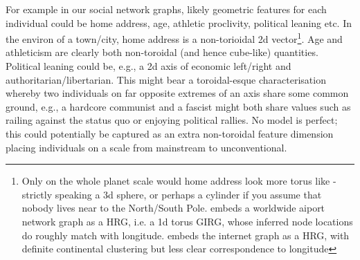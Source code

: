 
For example in our social network graphs, likely geometric features for each individual could be home address, age, athletic proclivity, political leaning etc.
In the environ of a town/city, home address is a non-torioidal 2d vector\footnote{Only on the whole planet scale would home address look more torus like - strictly speaking a 3d sphere, or perhaps a cylinder if you assume that nobody lives near to the North/South Pole. \cite{garcia2019mercator} embeds a worldwide aiport network graph as a HRG, i.e. a 1d torus GIRG, whose inferred node locations do roughly match with longitude. \cite{boguna2010sustaining} embeds the internet graph as a HRG, with definite continental clustering but less clear correspondence to longitude}.
Age and athleticism are clearly both non-toroidal (and hence cube-like) quantities.
Political leaning could be, e.g., a 2d axis of economic left/right and authoritarian/libertarian.
This might bear a toroidal-esque characterisation whereby two individuals on far opposite extremes of an axis share some common ground, e.g., a hardcore communist and a fascist might both share values such as railing against the status quo or enjoying political rallies.
No model is perfect; this could potentially be captured as an extra non-toroidal feature dimension placing individuals on a scale from mainstream to unconventional.

